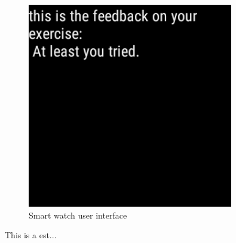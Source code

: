\begin{figure}[c]
\begin{minipage}{0.20\textwidth}
    \end{minipage}
    \begin{minipage}{0.20\textwidth}
      \centering
        \includegraphics[width=0.80\textwidth]{00_resources/figures/Android_Watch_FeedbackView.png}
    \end{minipage}
  \caption{Smart watch user interface}
  \label{fig:smwui}
\end{figure}

This is a est...
